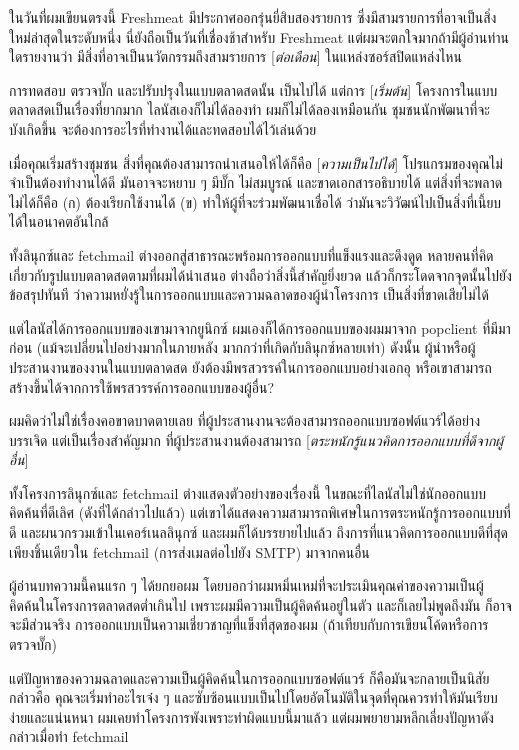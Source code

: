 {ในวันที่ผมเขียนตรงนี้ Freshmeat มีประกาศออกรุ่นยี่สิบสองรายการ
ซึ่งมีสามรายการที่อาจเป็นสิ่งใหม่ล่าสุดในระดับหนึ่ง
นี่ยังถือเป็นวันที่เชื่องช้าสำหรับ Freshmeat
แต่ผมจะตกใจมากถ้ามีผู้อ่านท่านใดรายงานว่า
มีสิ่งที่อาจเป็นนวัตกรรมถึงสามรายการ {[}\emph{ต่อเดือน}{]}
ในแหล่งซอร์สปิดแหล่งไหน}

การทดสอบ ตรวจบั๊ก และปรับปรุงในแบบตลาดสดนั้น เป็นไปได้ แต่การ
{[}\emph{เริ่มต้น}{]} โครงการในแบบตลาดสดเป็นเรื่องที่ยากมาก
ไลนัสเองก็ไม่ได้ลองทำ ผมก็ไม่ได้ลองเหมือนกัน
ชุมชนนักพัฒนาที่จะบังเกิดขึ้น
จะต้องการอะไรที่ทำงานได้และทดสอบได้ไว้เล่นด้วย

เมื่อคุณเริ่มสร้างชุมชน สิ่งที่คุณต้องสามารถนำเสนอให้ได้ก็คือ
{[}\emph{ความเป็นไปได้}{]} โปรแกรมของคุณไม่จำเป็นต้องทำงานได้ดี
มันอาจจะหยาบ ๆ  มีบั๊ก ไม่สมบูรณ์ และขาดเอกสารอธิบายได้
แต่สิ่งที่จะพลาดไม่ได้ก็คือ (ก) ต้องเรียกใช้งานได้ (ข)
ทำให้ผู้ที่จะร่วมพัฒนาเชื่อได้
ว่ามันจะวิวัฒน์ไปเป็นสิ่งที่เนี้ยบได้ในอนาคตอันใกล้

ทั้งลินุกซ์และ fetchmail
ต่างออกสู่สาธารณะพร้อมการออกแบบที่แข็งแรงและดึงดูด
หลายคนที่คิดเกี่ยวกับรูปแบบตลาดสดตามที่ผมได้นำเสนอ
ต่างถือว่าสิ่งนี้สำคัญยิ่งยวด แล้วก็กระโดดจากจุดนั้นไปยังข้อสรุปทันที
ว่าความหยั่งรู้ในการออกแบบและความฉลาดของผู้นำโครงการ
เป็นสิ่งที่ขาดเสียไม่ได้

แต่ไลนัสได้การออกแบบของเขามาจากยูนิกซ์ ผมเองก็ได้การออกแบบของผมมาจาก
popclient ที่มีมาก่อน (แม้จะเปลี่ยนไปอย่างมากในภายหลัง
มากกว่าที่เกิดกับลินุกซ์หลายเท่า) ดังนั้น
ผู้นำหรือผู้ประสานงานของงานในแบบตลาดสด
ยังต้องมีพรสวรรค์ในการออกแบบอย่างเอกอุ
หรือเขาสามารถสร้างขึ้นได้จากการใช้พรสวรรค์การออกแบบของผู้อื่น?

ผมคิดว่าไม่ใช่เรื่องคอขาดบาดตายเลย
ที่ผู้ประสานงานจะต้องสามารถออกแบบซอฟต์แวร์ได้อย่างบรรเจิด
แต่เป็นเรื่องสำคัญมาก ที่ผู้ประสานงานต้องสามารถ
{[}\emph{ตระหนักรู้แนวคิดการออกแบบที่ดีจากผู้อื่น}{]}

ทั้งโครงการลินุกซ์และ fetchmail ต่างแสดงตัวอย่างของเรื่องนี้
ในขณะที่ไลนัสไม่ใช่นักออกแบบคิดค้นที่ดีเลิศ (ดังที่ได้กล่าวไปแล้ว)
แต่เขาได้แสดงความสามารถพิเศษในการตระหนักรู้การออกแบบที่ดี
และผนวกรวมเข้าในเคอร์เนลลินุกซ์ และผมก็ได้บรรยายไปแล้ว
ถึงการที่แนวคิดการออกแบบดีที่สุดเพียงชิ้นเดียวใน fetchmail
(การส่งเมลต่อไปยัง SMTP) มาจากคนอื่น

ผู้อ่านบทความนี้คนแรก ๆ  ได้ยกยอผม
โดยบอกว่าผมหมิ่นเหม่ที่จะประเมินคุณค่าของความเป็นผู้คิดค้นในโครงการตลาดสดต่ำเกินไป
เพราะผมมีความเป็นผู้คิดค้นอยู่ในตัว และก็เลยไม่พูดถึงมัน
ก็อาจจะมีส่วนจริง การออกแบบเป็นความเชี่ยวชาญที่แข็งที่สุดของผม
(ถ้าเทียบกับการเขียนโค้ดหรือการตรวจบั๊ก)

แต่ปัญหาของความฉลาดและความเป็นผู้คิดค้นในการออกแบบซอฟต์แวร์
ก็คือมันจะกลายเป็นนิสัย กล่าวคือ คุณจะเริ่มทำอะไรเจ๋ง ๆ
และซับซ้อนแบบเป็นไปโดยอัตโนมัติในจุดที่คุณควรทำให้มันเรียบง่ายและแน่นหนา
ผมเคยทำโครงการพังเพราะทำผิดแบบนี้มาแล้ว
แต่ผมพยายามหลีกเลี่ยงปัญหาดังกล่าวเมื่อทำ fetchmail

